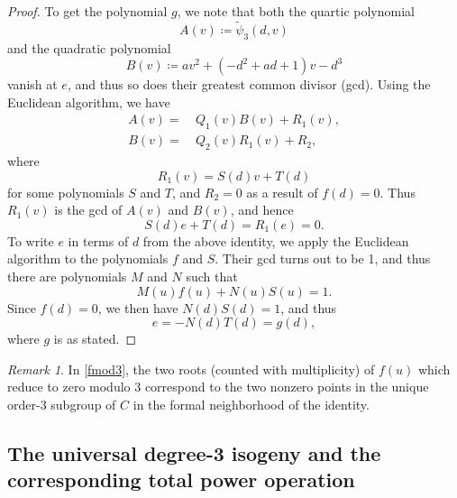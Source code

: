 \documentclass{gtpart}
\theoremstyle{definition}
\theoremstyle{remark}
\newtheorem{rmk}[thm]{Remark}
\newcommand{\TP}{\widetilde{\psi}}
\begin{document}
\begin{proof}
 To get the polynomial $g$, we note that both the quartic polynomial 
 \[
  A(v) \coloneqq \TP_3(d,v) 
 \]
 and the quadratic polynomial 
 \[
  B(v) \coloneqq a v^2 + (-d^2 + a d + 1) v - d^3 
 \]
 vanish at $e$, and thus so does their greatest common divisor (gcd).  Using the Euclidean algorithm, we have 
 \begin{equation*}
 \begin{split}
  A(v) = & ~ Q_1(v) B(v) + R_1(v), \\
  B(v) = & ~ Q_2(v) R_1(v) + R_2, 
 \end{split}
 \end{equation*}
 where 
 \[
  R_1(v) = S(d) v + T(d) 
 \]
 for some polynomials $S$ and $T$, and $R_2 = 0$ as a result of $f(d) = 0$.  Thus $R_1(v)$ is the gcd of $A(v)$ and $B(v)$, and hence 
 \[
  S(d) e + T(d) = R_1(e) = 0.  
 \]
 To write $e$ in terms of $d$ from the above identity, we apply the Euclidean algorithm to the polynomials $f$ and $S$.  
 Their gcd turns out to be 1, and thus there are polynomials $M$ and $N$ such that 
 \[
  M(u) f(u) + N(u) S(u) = 1.  
 \]
 Since $f(d) = 0$, we then have $N(d) S(d) = 1$, and thus 
 \[
  e = -N(d) T(d) = g(d), 
 \]
 where $g$ is as stated.  
\end{proof}

\begin{rmk}
\label{rmk:dmod3}
 In \eqref{fmod3}, the two roots (counted with multiplicity) of $f(u)$ which reduce to zero modulo 3 correspond to 
 the two nonzero points in the unique order-3 subgroup of $C$ in the formal neighborhood of the identity.  
\end{rmk}


\subsection{The universal degree-3 isogeny and the corresponding total power operation}
\label{subsec:psi3}
\end{document}
